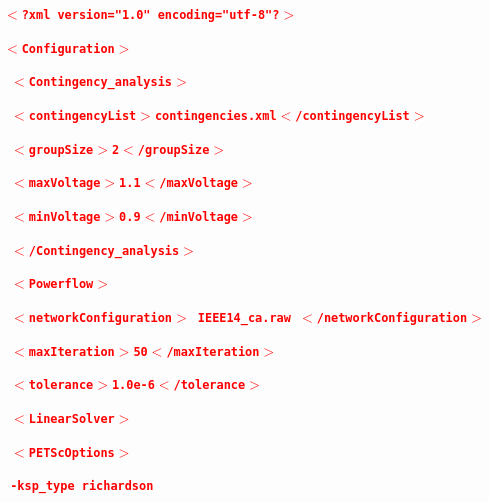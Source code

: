 \documentclass[12pt]{report} %
\begin{document}
\textcolor{red}{\texttt{\textbf{$\boldsymbol{\mathrm{<}}$?xml version="1.0" encoding="utf-8"?$\boldsymbol{\mathrm{>}}$}}}

\textcolor{red}{\texttt{\textbf{$\boldsymbol{\mathrm{<}}$Configuration$\boldsymbol{\mathrm{>}}$}}}

\textcolor{red}{\texttt{\textbf{  $\boldsymbol{\mathrm{<}}$Contingency\_analysis$\boldsymbol{\mathrm{>}}$}}}

\textcolor{red}{\texttt{\textbf{    $\boldsymbol{\mathrm{<}}$contingencyList$\boldsymbol{\mathrm{>}}$contingencies.xml$\boldsymbol{\mathrm{<}}$/contingencyList$\boldsymbol{\mathrm{>}}$}}}

\textcolor{red}{\texttt{\textbf{    $\boldsymbol{\mathrm{<}}$groupSize$\boldsymbol{\mathrm{>}}$2$\boldsymbol{\mathrm{<}}$/groupSize$\boldsymbol{\mathrm{>}}$}}}

\textcolor{red}{\texttt{\textbf{    $\boldsymbol{\mathrm{<}}$maxVoltage$\boldsymbol{\mathrm{>}}$1.1$\boldsymbol{\mathrm{<}}$/maxVoltage$\boldsymbol{\mathrm{>}}$}}}

\textcolor{red}{\texttt{\textbf{    $\boldsymbol{\mathrm{<}}$minVoltage$\boldsymbol{\mathrm{>}}$0.9$\boldsymbol{\mathrm{<}}$/minVoltage$\boldsymbol{\mathrm{>}}$}}}

\textcolor{red}{\texttt{\textbf{  $\boldsymbol{\mathrm{<}}$/Contingency\_analysis$\boldsymbol{\mathrm{>}}$}}}

\textcolor{red}{\texttt{\textbf{  $\boldsymbol{\mathrm{<}}$Powerflow$\boldsymbol{\mathrm{>}}$}}}

\textcolor{red}{\texttt{\textbf{    $\boldsymbol{\mathrm{<}}$networkConfiguration$\boldsymbol{\mathrm{>}}$ IEEE14\_ca.raw $\boldsymbol{\mathrm{<}}$/networkConfiguration$\boldsymbol{\mathrm{>}}$}}}

\textcolor{red}{\texttt{\textbf{    $\boldsymbol{\mathrm{<}}$maxIteration$\boldsymbol{\mathrm{>}}$50$\boldsymbol{\mathrm{<}}$/maxIteration$\boldsymbol{\mathrm{>}}$}}}

\textcolor{red}{\texttt{\textbf{    $\boldsymbol{\mathrm{<}}$tolerance$\boldsymbol{\mathrm{>}}$1.0e-6$\boldsymbol{\mathrm{<}}$/tolerance$\boldsymbol{\mathrm{>}}$}}}

\textcolor{red}{\texttt{\textbf{    $\boldsymbol{\mathrm{<}}$LinearSolver$\boldsymbol{\mathrm{>}}$}}}

\textcolor{red}{\texttt{\textbf{      $\boldsymbol{\mathrm{<}}$PETScOptions$\boldsymbol{\mathrm{>}}$}}}

\textcolor{red}{\texttt{\textbf{        -ksp\_type richardson}}}
\end{document}
